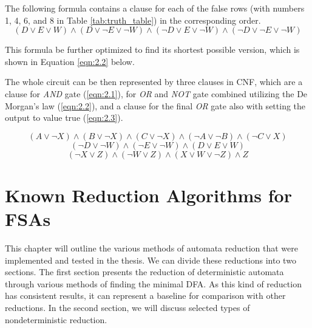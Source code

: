 The following formula contains a clause for each of the false rows (with numbers 1, 4, 6, and 8 in Table \ref{tab:truth_table}) in the corresponding order.
\begin{equation*}
    (D \lor E \lor W) \land (D \lor \neg E \lor \neg W) \land (\neg D \lor E \lor \neg W) \land (\neg D \lor \neg E \lor \neg W)
\end{equation*}

This formula be further optimized to find its shortest possible version, which is shown in Equation \ref{eqn:2.2} below. 

The whole circuit can be then represented by three clauses in CNF, which are a clause for \textit{AND} gate (\ref{eqn:2.1}), for \textit{OR} and \textit{NOT} gate combined utilizing the De Morgan's law (\ref{eqn:2.2}), and a clause for the final \textit{OR} gate also with setting the output to value true (\ref{eqn:2.3}).

\begin{equation}
\label{eqn:2.1}
   (A \lor \neg X) \land (B \lor \neg X) \land (C \lor \neg X) \land (\neg A \lor \neg B) \land (\neg C \lor X)
\end{equation}
\begin{equation}
\label{eqn:2.2}
    (\neg D \lor \neg W) \land (\neg E \lor \neg W) \land (D \lor E \lor W)
\end{equation}
\begin{equation}
\label{eqn:2.3}
    (\neg X \lor Z) \land (\neg W \lor Z) \land (X \lor W \lor \neg Z) \land Z
\end{equation}


\chapter{Known Reduction Algorithms for FSAs}
\label{chap:reduction}
This chapter will outline the various methods of automata reduction that were implemented and tested in the thesis. We can divide these reductions into two sections. The first section presents the reduction of deterministic automata through various methods of finding the minimal DFA. As this kind of reduction has consistent results, it can represent a baseline for comparison with other reductions. In the second section, we will discuss selected types of nondeterministic reduction.


